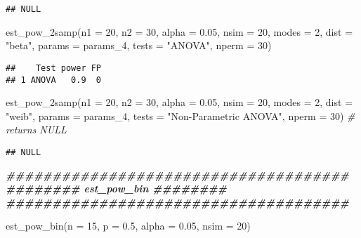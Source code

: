 \documentclass[
]{article}
\newenvironment{Shaded}{\begin{snugshade}}{\end{snugshade}}
\newcommand{\AttributeTok}[1]{\textcolor[rgb]{0.77,0.63,0.00}{#1}}
\newcommand{\CommentTok}[1]{\textcolor[rgb]{0.56,0.35,0.01}{\textit{#1}}}
\newcommand{\DecValTok}[1]{\textcolor[rgb]{0.00,0.00,0.81}{#1}}
\newcommand{\DocumentationTok}[1]{\textcolor[rgb]{0.56,0.35,0.01}{\textbf{\textit{#1}}}}
\newcommand{\FloatTok}[1]{\textcolor[rgb]{0.00,0.00,0.81}{#1}}
\newcommand{\FunctionTok}[1]{\textcolor[rgb]{0.00,0.00,0.00}{#1}}
\newcommand{\NormalTok}[1]{#1}
\newcommand{\StringTok}[1]{\textcolor[rgb]{0.31,0.60,0.02}{#1}}
\begin{document}
\begin{verbatim}
## NULL
\end{verbatim}

\begin{Shaded}
\begin{Highlighting}[]
\FunctionTok{est\_pow\_2samp}\NormalTok{(}\AttributeTok{n1 =} \DecValTok{20}\NormalTok{, }\AttributeTok{n2 =} \DecValTok{30}\NormalTok{, }\AttributeTok{alpha =} \FloatTok{0.05}\NormalTok{, }\AttributeTok{nsim =} \DecValTok{20}\NormalTok{, }\AttributeTok{modes =} \DecValTok{2}\NormalTok{, }\AttributeTok{dist =} \StringTok{"beta"}\NormalTok{, }\AttributeTok{params =}\NormalTok{ params\_4, }\AttributeTok{tests =} \StringTok{"ANOVA"}\NormalTok{, }\AttributeTok{nperm =} \DecValTok{30}\NormalTok{)  }
\end{Highlighting}
\end{Shaded}

\begin{verbatim}
##    Test power FP
## 1 ANOVA   0.9  0
\end{verbatim}

\begin{Shaded}
\begin{Highlighting}[]
\FunctionTok{est\_pow\_2samp}\NormalTok{(}\AttributeTok{n1 =} \DecValTok{20}\NormalTok{, }\AttributeTok{n2 =} \DecValTok{30}\NormalTok{, }\AttributeTok{alpha =} \FloatTok{0.05}\NormalTok{, }\AttributeTok{nsim =} \DecValTok{20}\NormalTok{, }\AttributeTok{modes =} \DecValTok{2}\NormalTok{, }\AttributeTok{dist =} \StringTok{"weib"}\NormalTok{, }\AttributeTok{params =}\NormalTok{ params\_4, }\AttributeTok{tests =} \StringTok{"Non{-}Parametric ANOVA"}\NormalTok{, }\AttributeTok{nperm =} \DecValTok{30}\NormalTok{) }\CommentTok{\# returns NULL}
\end{Highlighting}
\end{Shaded}

\begin{verbatim}
## NULL
\end{verbatim}

\begin{Shaded}
\begin{Highlighting}[]
\DocumentationTok{\#\#\#\#\#\#\#\#\#\#\#\#\#\#\#\#\#\#\#\#\#\#\#\#\#\#\#\#\#\#\#\#\#\#\#\#\#}
\DocumentationTok{\#\#\#\#\#\#\#\# est\_pow\_bin \#\#\#\#\#\#\#\#}
\DocumentationTok{\#\#\#\#\#\#\#\#\#\#\#\#\#\#\#\#\#\#\#\#\#\#\#\#\#\#\#\#\#\#\#\#\#\#\#\#\#}

\FunctionTok{est\_pow\_bin}\NormalTok{(}\AttributeTok{n =} \DecValTok{15}\NormalTok{, }\AttributeTok{p =} \FloatTok{0.5}\NormalTok{, }\AttributeTok{alpha =} \FloatTok{0.05}\NormalTok{, }\AttributeTok{nsim =} \DecValTok{20}\NormalTok{)}
\end{Highlighting}
\end{Shaded}
\end{document}
